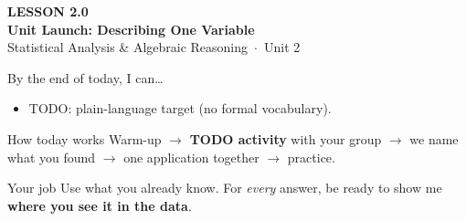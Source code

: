 \documentclass[aspectratio=169, 11pt]{beamer}
\begin{document}
{
\begin{frame}[plain]
  \vspace{2.8cm}\hspace{0.55cm}%
  \begin{minipage}{0.9\textwidth}
    {\color{goldacc}\bfseries\small LESSON 2.0}\\[0.5cm]
    {\color{white}\bfseries\LARGE Unit Launch: Describing One Variable}\\[1.2cm]
    {\color{frostmid}\small Statistical Analysis \& Algebraic Reasoning~$\cdot$~Unit 2}
  \end{minipage}
\end{frame}
}

\newcommand{\redink}[1]{{\color{redacc}\bfseries #1}}

\begin{frame}[t, plain]
  By the end of today, I can\ldots
  \begin{itemize}\setlength{\itemsep}{6pt}
    \item TODO: plain-language target (no formal vocabulary).
  \end{itemize}
  \begin{block}{How today works}
    Warm-up $\to$ \textbf{TODO activity} with your group $\to$ we name what you found $\to$
    one application together $\to$ practice.
  \end{block}
\end{frame}

\begin{frame}[t, plain]
\end{frame}

\begin{frame}[t, plain]
  \begin{block}{Your job}
    Use what you already know. For \emph{every} answer, be ready to show me
    \textbf{where you see it in the data}.
  \end{block}
\end{frame}
\end{document}
